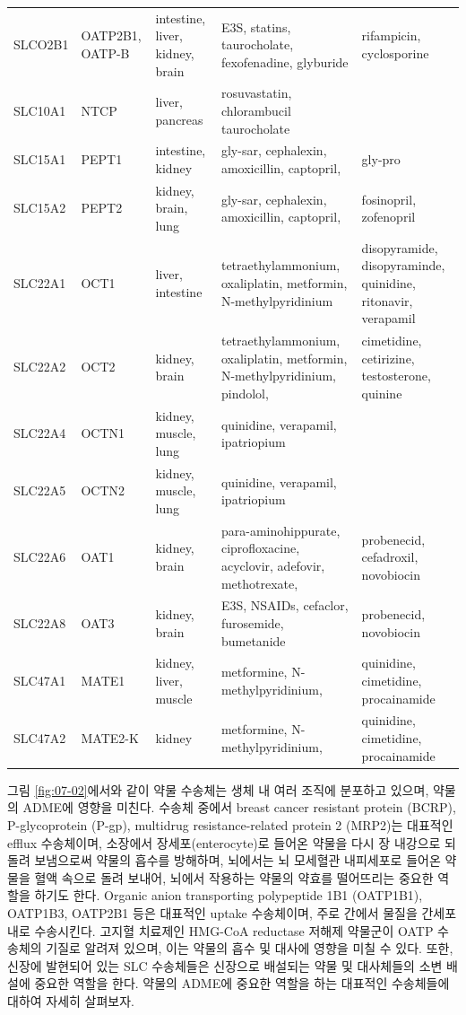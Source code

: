 \documentclass[
  11pt,
  krantz2, a4paper, twoside]{krantz}
\begin{document}
\begin{table}
\begin{tabular}[t]{lllll}
SLCO2B1 & OATP2B1, OATP-B & intestine, liver, kidney, brain & E3S, statins, taurocholate, fexofenadine, glyburide & rifampicin, cyclosporine\\
SLC10A1 & NTCP & liver, pancreas & rosuvastatin, chlorambucil taurocholate & \\
\addlinespace
SLC15A1 & PEPT1 & intestine, kidney & gly-sar, cephalexin, amoxicillin, captopril, & gly-pro\\
SLC15A2 & PEPT2 & kidney, brain, lung & gly-sar, cephalexin, amoxicillin, captopril, & fosinopril, zofenopril\\
SLC22A1 & OCT1 & liver, intestine & tetraethylammonium, oxaliplatin, metformin, N-methylpyridinium & disopyramide, disopyraminde, quinidine, ritonavir, verapamil\\
SLC22A2 & OCT2 & kidney, brain & tetraethylammonium, oxaliplatin, metformin, N-methylpyridinium, pindolol, & cimetidine, cetirizine, testosterone, quinine\\
SLC22A4 & OCTN1 & kidney, muscle, lung & quinidine, verapamil, ipatriopium & \\
\addlinespace
SLC22A5 & OCTN2 & kidney, muscle, lung & quinidine, verapamil, ipatriopium & \\
SLC22A6 & OAT1 & kidney, brain & para-aminohippurate, ciprofloxacine, acyclovir, adefovir, methotrexate, & probenecid, cefadroxil, novobiocin\\
SLC22A8 & OAT3 & kidney, brain & E3S, NSAIDs, cefaclor, furosemide, bumetanide & probenecid, novobiocin\\
SLC47A1 & MATE1 & kidney, liver, muscle & metformine, N-methylpyridinium, & quinidine, cimetidine, procainamide\\
SLC47A2 & MATE2-K & kidney & metformine, N-methylpyridinium, & quinidine, cimetidine, procainamide\\
\bottomrule
\end{tabular}
\end{table}

그림 \ref{fig:07-02}에서와 같이 약물 수송체는 생체 내 여러 조직에
분포하고 있으며, 약물의 ADME에 영향을 미친다. 수송체 중에서 breast
cancer resistant protein (BCRP), P-glycoprotein (P-gp), multidrug
resistance-related protein 2 (MRP2)는 대표적인 efflux 수송체이며,
소장에서 장세포(enterocyte)로 들어온 약물을 다시 장 내강으로 되돌려
보냄으로써 약물의 흡수를 방해하며, 뇌에서는 뇌 모세혈관 내피세포로
들어온 약물을 혈액 속으로 돌려 보내어, 뇌에서 작용하는 약물의 약효를
떨어뜨리는 중요한 역할을 하기도 한다. Organic anion transporting
polypeptide 1B1 (OATP1B1), OATP1B3, OATP2B1 등은 대표적인 uptake
수송체이며, 주로 간에서 물질을 간세포 내로 수송시킨다. 고지혈 치료제인
HMG-CoA reductase 저해제 약물군이 OATP 수송체의 기질로 알려져 있으며,
이는 약물의 흡수 및 대사에 영향을 미칠 수 있다. 또한, 신장에 발현되어
있는 SLC 수송체들은 신장으로 배설되는 약물 및 대사체들의 소변 배설에
중요한 역할을 한다. 약물의 ADME에 중요한 역할을 하는 대표적인 수송체들에
대하여 자세히 살펴보자.
\end{document}
